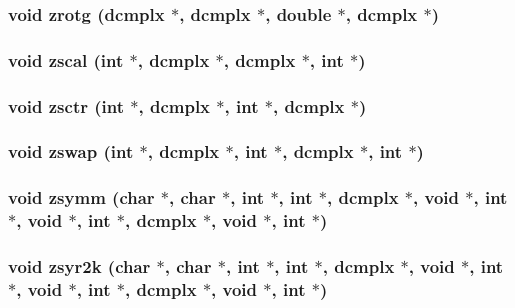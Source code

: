 \subsubsection{\setlength{\rightskip}{0pt plus 5cm}void zrotg ({\bf dcmplx} $\ast$, {\bf dcmplx} $\ast$, double $\ast$, {\bf dcmplx} $\ast$)}\label{essl_8h_fd9f2830fb5ff4ccd21f75232dd8c4bc}


\subsubsection{\setlength{\rightskip}{0pt plus 5cm}void zscal (int $\ast$, {\bf dcmplx} $\ast$, {\bf dcmplx} $\ast$, int $\ast$)}\label{essl_8h_98696e593db07daeb4f3f1c3d2efccbc}


\subsubsection{\setlength{\rightskip}{0pt plus 5cm}void zsctr (int $\ast$, {\bf dcmplx} $\ast$, int $\ast$, {\bf dcmplx} $\ast$)}\label{essl_8h_f6632ce9fc2fb024b13623fa8fef0b43}


\subsubsection{\setlength{\rightskip}{0pt plus 5cm}void zswap (int $\ast$, {\bf dcmplx} $\ast$, int $\ast$, {\bf dcmplx} $\ast$, int $\ast$)}\label{essl_8h_d8353cd178b5741e297505616e5a7bc9}


\subsubsection{\setlength{\rightskip}{0pt plus 5cm}void zsymm (char $\ast$, char $\ast$, int $\ast$, int $\ast$, {\bf dcmplx} $\ast$, void $\ast$, int $\ast$, void $\ast$, int $\ast$, {\bf dcmplx} $\ast$, void $\ast$, int $\ast$)}\label{essl_8h_ad63cd7dcd8da994989af9bd92e9f45a}


\subsubsection{\setlength{\rightskip}{0pt plus 5cm}void zsyr2k (char $\ast$, char $\ast$, int $\ast$, int $\ast$, {\bf dcmplx} $\ast$, void $\ast$, int $\ast$, void $\ast$, int $\ast$, {\bf dcmplx} $\ast$, void $\ast$, int $\ast$)}\label{essl_8h_1baf225cba0474d0a662c7c1bf6ddc54}


